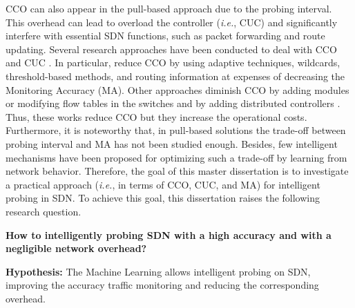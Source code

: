 CCO can also appear in the  pull-based approach due to the probing interval. This overhead can lead to overload the controller (\textit{i.e.}, CUC) and significantly interfere with essential SDN functions, such as packet forwarding and route updating. Several research approaches have been conducted to deal with CCO and CUC \cite{chowdhury_2014:payless, raumer_2014:monsamp, van_2014:OpenNetMon, tahaei_2017:multi-objective, Tootoonchian_2010:opentm, Sun_2015:HONE, phan2017:sdn_mon, liao_2018:LLDP-looping,su_2014:flowcover,jose_2011:online_measurement, tangari_2017:decentralized_monitoring, Tangari_2018:adaptive_decentralized_monitoring, phan2017:adaptive_sdn_mon, tahaei_2018:cost_effective}. In particular, \cite{chowdhury_2014:payless, raumer_2014:monsamp, van_2014:OpenNetMon, tahaei_2017:multi-objective, Tootoonchian_2010:opentm} reduce CCO by using adaptive techniques, wildcards, threshold-based methods, and routing information at expenses of decreasing the Monitoring Accuracy (MA). Other approaches  diminish CCO by adding modules or modifying flow tables in the switches \cite{Sun_2015:HONE, su_2014:flowcover, phan2017:sdn_mon, liao_2018:LLDP-looping} and by adding distributed controllers \cite{jose_2011:online_measurement, tangari_2017:decentralized_monitoring, Tangari_2018:adaptive_decentralized_monitoring, phan2017:adaptive_sdn_mon, tahaei_2018:cost_effective}. Thus, these works reduce CCO but they increase the operational costs. Furthermore, it is noteworthy that, in pull-based solutions the trade-off between probing interval and MA has not been studied enough. Besides, few intelligent mechanisms have been proposed for optimizing such a trade-off by learning from network behavior. Therefore, the goal of this master dissertation is to investigate a practical approach (\textit{i.e.}, in terms of CCO, CUC, and MA) for intelligent probing in SDN. To achieve this goal, this dissertation raises the following research question.

\begin{center}
\textbf{How to intelligently probing SDN with a high accuracy and with a negligible network overhead?}\\
\end{center}

\textbf{Hypothesis:} The Machine Learning allows intelligent probing on SDN, improving the accuracy traffic monitoring and reducing the corresponding overhead.


